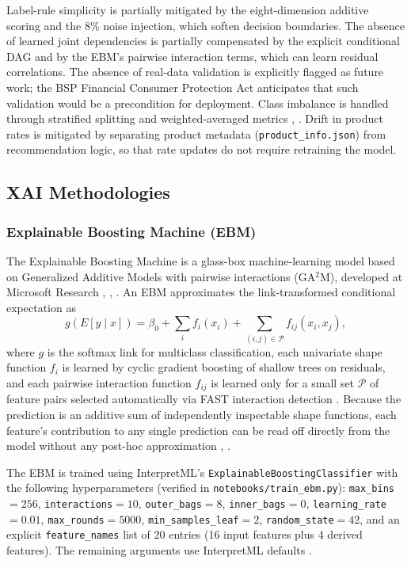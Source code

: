 \documentclass[journal]{./IEEE/IEEEtran}
\begin{document}
Label-rule simplicity is partially mitigated by the eight-dimension additive scoring and the 8\% noise injection, which soften decision boundaries. The absence of learned joint dependencies is partially compensated by the explicit conditional DAG and by the EBM's pairwise interaction terms, which can learn residual correlations. The absence of real-data validation is explicitly flagged as future work; the BSP Financial Consumer Protection Act \cite{ref44} anticipates that such validation would be a precondition for deployment. Class imbalance is handled through stratified splitting and weighted-averaged metrics \cite{ref58}, \cite{ref78}. Drift in product rates is mitigated by separating product metadata (\texttt{product\_info.json}) from recommendation logic, so that rate updates do not require retraining the model.
\subsection{XAI Methodologies}


\subsubsection{Explainable Boosting Machine (EBM)}

The Explainable Boosting Machine is a glass-box machine-learning model based on Generalized Additive Models with pairwise interactions (GA$^2$M), developed at Microsoft Research \cite{ref48}, \cite{ref49}, \cite{ref15}. An EBM approximates the link-transformed conditional expectation as
\begin{equation*}
    g(E[y \mid x]) = \beta_0 + \sum_{i} f_i(x_i) + \sum_{(i,j) \in \mathcal{P}} f_{ij}(x_i, x_j),
\end{equation*}
where $g$ is the softmax link for multiclass classification, each univariate shape function $f_i$ is learned by cyclic gradient boosting of shallow trees on residuals, and each pairwise interaction function $f_{ij}$ is learned only for a small set $\mathcal{P}$ of feature pairs selected automatically via FAST interaction detection \cite{ref49}. Because the prediction is an additive sum of independently inspectable shape functions, each feature's contribution to any single prediction can be read off directly from the model without any post-hoc approximation \cite{ref50}, \cite{ref15}.

The EBM is trained using InterpretML's \texttt{ExplainableBoostingClassifier} with the following hyperparameters (verified in \texttt{notebooks/train\_ebm.py}): \texttt{max\_bins}$=256$, \texttt{interactions}$=10$, \texttt{outer\_bags}$=8$, \texttt{inner\_bags}$=0$, \texttt{learning\_rate}$=0.01$, \texttt{max\_rounds}$=5000$, \texttt{min\_samples\_leaf}$=2$, \texttt{random\_state}$=42$, and an explicit \texttt{feature\_names} list of 20 entries (16 input features plus 4 derived features). The remaining arguments use InterpretML defaults \cite{ref15}.
\end{document}

